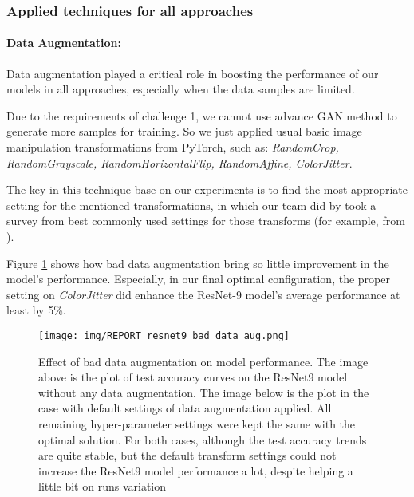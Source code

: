 \documentclass[10pt,twocolumn,letterpaper]{article}
\begin{document}
\subsubsection{Applied techniques for all approaches}
\label{subsubsection:challenge1_techniques}

\paragraph{Data Augmentation:}
Data augmentation played a critical role in boosting the performance of our models in all approaches, especially when the data samples are limited.

Due to the requirements of challenge 1, we cannot use advance GAN method to generate more samples for training. So we just applied usual basic image manipulation transformations from PyTorch, such as: \textit{RandomCrop, RandomGrayscale, RandomHorizontalFlip, RandomAffine, ColorJitter}.

The key in this technique base on our experiments is to find the most appropriate setting for the mentioned transformations, in which our team did by took a survey from best commonly used settings for those transforms (for example, from \cite{programcreek:colorjitter}).

Figure \ref{figure:data_aug_challenge1} shows how bad data augmentation bring so little improvement in the model's performance. Especially, in our final optimal configuration, the proper setting on \textit{ColorJitter} did enhance the ResNet-9 model's average performance at least by 5\%.



\begin{figure}[h!]
  \centering
      \texttt{[image: img/REPORT\_resnet9\_bad\_data\_aug.png]}
      \caption{Effect of bad data augmentation on model performance. The image above is the plot of test accuracy curves on the ResNet9 model without any data augmentation. The image below is the plot in the case with default settings of data augmentation applied. All remaining hyper-parameter settings were kept the same with the optimal solution. For both cases, although the test accuracy trends are quite stable, but the default transform settings could not increase the ResNet9 model performance a lot, despite helping a little bit on runs variation\label{figure:data_aug_challenge1}}
\end{figure}
\end{document}
